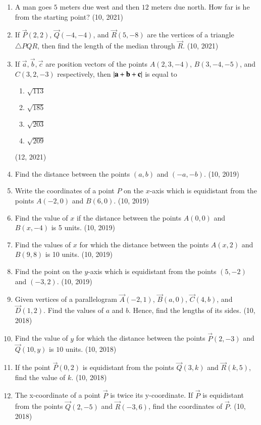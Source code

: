 \begin{enumerate}[label=\thesubsection.\arabic*, ref=\thesubsection.\theenumi]
	\item A man goes $5$ meters due west and then $12$ meters due north. How far is he from the starting point? \hfill (10, 2021)
		\item If $\vec{P}(2, 2)$, $\vec{Q}(-4, -4)$, and $\vec{R}(5, -8)$ are the vertices of a triangle $\triangle PQR$, then find the length of the median through $\vec{R}$. \hfill (10, 2021)
	\item If $\vec{a}, \vec{b}, \vec{c}$ are position vectors of the points $A(2, 3, -4)$, $B(3, -4, -5)$, and $C(3, 2, -3)$ respectively, then $\left\vert\mathbf{a}+\mathbf{b}+\mathbf{c}\right\vert$ is equal to
		\begin{enumerate}
			\item $\sqrt{113}$
			\item $\sqrt{185}$
			\item $\sqrt{203}$
			\item $\sqrt{209}$
		\end{enumerate}
	\hfill (12, 2021)
\item Find the distance between the points $(a, b)$ and $(-a, -b)$. \hfill (10, 2019)
\item Write the coordinates of a point $P$ on the $x$-axis which is equidistant from the points $A(-2, 0)$ and $B(6, 0)$. \hfill (10, 2019)
\item Find the value of $x$ if the distance between the points $A(0, 0)$ and $B(x, -4)$ is 5 units. \hfill (10, 2019)
\item Find the values of $x$ for which the distance between the points $A(x, 2)$ and $B(9, 8)$ is 10 units. \hfill (10, 2019)
\item Find the point on the $y$-axis which is equidistant from the points $(5, -2)$ and $(-3, 2)$. \hfill (10, 2019)
    \item Given vertices of a parallelogram $\vec{A}(-2,1)$, $\vec{B}(a,0)$, $\vec{C}(4,b)$, and $\vec{D}(1,2)$. Find the values of $a$ and $b$. Hence, find the lengths of its sides. \hfill (10, 2018)
    \item Find the value of $y$ for which the distance between the points $\vec{P}(2,-3)$ and $\vec{Q}(10,y)$ is $10$ units. \hfill (10, 2018)
    \item If the point $\vec{P}(0,2)$ is equidistant from the points $\vec{Q}(3,k)$ and $\vec{R}(k,5)$, find the value of $k$. \hfill (10, 2018)
    \item The x-coordinate of a point $\vec{P}$ is twice its y-coordinate. If $\vec{P}$ is equidistant from the points $\vec{Q}(2,-5)$ and $\vec{R}(-3,6)$, find the coordinates of $\vec{P}$. \hfill (10, 2018)
\end{enumerate}
